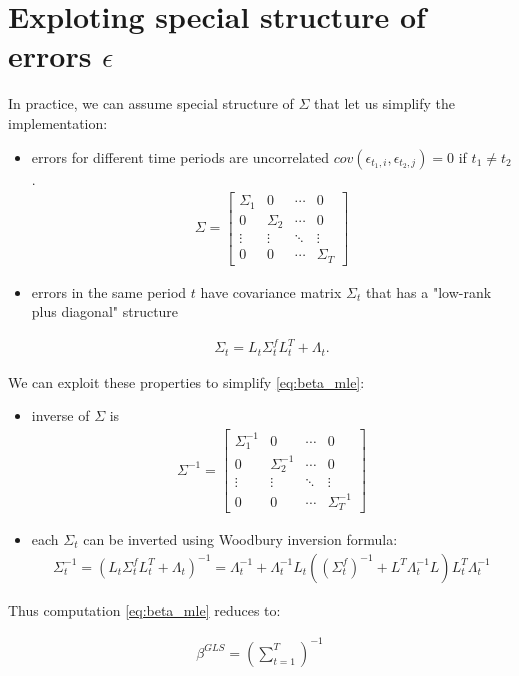 \section{Exploting special structure of errors $\epsilon$}

In practice, we can assume special structure of $\Sigma$ that let us simplify the implementation:
\begin{itemize}
	\item errors for different time periods are uncorrelated $cov(\epsilon_{t_1, i}, \epsilon_{t_2, j})=0$ if $t_1 \neq t_2$.
\begin{align}
	\label{eq:block_diagonal_sigma}
	 \Sigma =
\begin{bmatrix}
	\Sigma_1 & 0 & \cdots & 0 \\
	0 & \Sigma_2 & \cdots & 0 \\
	\vdots & \vdots & \ddots & \vdots \\
	0 & 0 & \cdots & \Sigma_T
\end{bmatrix}
\end{align}

	\item errors in the same period $t$ have covariance matrix $\Sigma_t$ that has a "low-rank plus diagonal" structure 
	
	\begin{align}
	\Sigma_t = L_t \Sigma^f_t L_t^T + \Lambda_t.
	\end{align}
\end{itemize}

We can exploit these properties to simplify \autoref{eq:beta_mle}:
\begin{itemize}
	\item inverse of $\Sigma$ is
\begin{align}
\Sigma^{-1} = \begin{bmatrix}
	\Sigma_1^{-1} & 0 & \cdots & 0 \\
	0 & \Sigma_2^{-1} & \cdots & 0 \\
	\vdots & \vdots & \ddots & \vdots \\
	0 & 0 & \cdots & \Sigma_T^{-1}
\end{bmatrix}
\end{align}
\item each $\Sigma_t$ can be inverted using Woodbury inversion formula:
\begin{align}
	\Sigma_t^{-1} = (L_t \Sigma^f_t L_t^T + \Lambda_t)^{-1} = \Lambda_t^{-1} + \Lambda_t^{-1} L_t ((\Sigma^f_t) ^ {-1} + L^T \Lambda_t^{-1} L ) L_t^T \Lambda_t^{-1}
\end{align}

\end{itemize}

Thus computation \autoref{eq:beta_mle} reduces to:

\begin{align}
	\beta^{GLS} = (\sum_{t=1}^T )^{-1}
\end{align}

